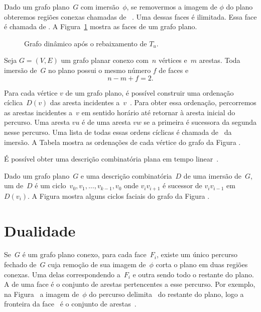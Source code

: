 Dado um grafo plano~$G$ com imersão~$\phi$, se removermos a imagem de $\phi$ do plano obteremos regiões conexas chamadas de ~\cite{planarTheoryAlgorith}.
Uma dessas faces é ilimitada.
Essa face é chamada de .
A Figura~\ref{fig:MSF-figura-1-faces} mostra as faces de um grafo plano.

\begin{figure}[htb]
\centering
\caption{Grafo dinâmico após o rebaixamento de $T_u$.}
\label{fig:MSF-figura-1-faces}
\end{figure}

\begin{theorem}
\label{teo:MSFEuler}
Seja $G=(V,E)$ um grafo planar conexo com~$n$ vértices e~$m$ arestas. Toda imersão de~$G$ no plano possui o mesmo número $f$ de faces e
$$
n-m+f = 2.
$$
\end{theorem}

Para cada vértice $v$ de um grafo plano, é possível construir uma ordenação cíclica~$D(v)$ das aresta incidentes a~$v$~\cite{noma2003}.
Para obter essa ordenação, percorremos as arestas incidentes a~$v$ em sentido horário até retornar à aresta inicial do percurso.
Uma aresta $vu$ é  de uma aresta $vw$ se a primeira é sucessora da segunda nesse percurso.
Uma lista de todas essas ordens cíclicas é chamada de~ da imersão.
A Tabela  mostra as ordenações de cada vértice do grafo da Figura .

É possível obter uma descrição combinatória plana em tempo linear~.

Dado um grafo plano~$G$ e uma descrição combinatória~$D$ de uma imersão de~$G$, um  de~$D$ é um ciclo~$v_0,v_1,\ldots,v_{k-1},v_0$ onde $v_iv_{i+1}$ é sucessor de $v_iv_{i-1}$ em $D(v_i)$.
A Figura  mostra alguns ciclos faciais do grafo da Figura .

\section{Dualidade}

Se~$G$ é um grafo plano conexo, para cada face~$F_i$, existe um único percurso fechado de~$G$ cuja remoção de sua imagem de~$\phi$ corta o plano em duas regiões conexas.
Uma delas correspondendo a~$F_i$ e outra sendo todo o restante do plano.
A  de uma face é o conjunto de arestas pertencentes a esse percurso.
Por exemplo, na Figura~ a imagem de~$\phi$ do percurso  delimita~ do restante do plano, logo a fronteira da face~ é o conjunto de arestas~.

